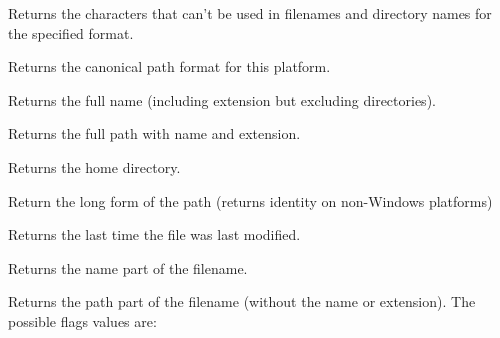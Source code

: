 Returns the characters that can't be used in filenames and directory names for the specified format.


\label{wxfilenamegetformat}


Returns the canonical path format for this platform.


\label{wxfilenamegetfullname}


Returns the full name (including extension but excluding directories).


\label{wxfilenamegetfullpath}


Returns the full path with name and extension.


\label{wxfilenamegethomedir}


Returns the home directory.


\label{wxfilenamegetlongpath}


Return the long form of the path (returns identity on non-Windows platforms)


\label{wxfilenamegetmodificationtime}


Returns the last time the file was last modified.


\label{wxfilenamegetname}


Returns the name part of the filename.


\label{wxfilenamegetpath}


Returns the path part of the filename (without the name or extension). The
possible flags values are:

